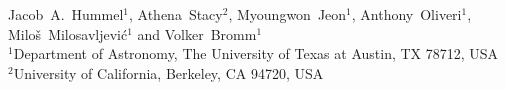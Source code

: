 
Jacob~A.~Hummel$^1$, Athena~Stacy$^2$, Myoungwon~Jeon$^1$, Anthony~Oliveri$^1$, \newauthor Milo\v s~Milosavljevi\'c$^1$ and Volker~Bromm$^1$\\
$^1$Department of Astronomy, The University of Texas at Austin, TX 78712, USA\\
$^2$University of California, Berkeley, CA 94720, USA
 

